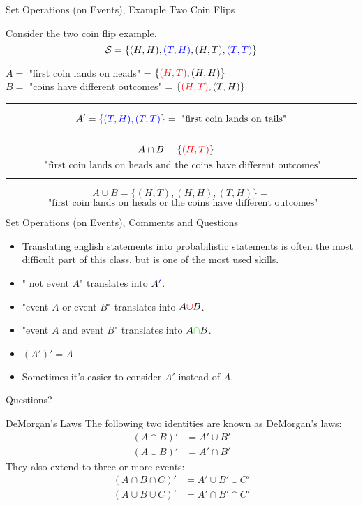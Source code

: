 \documentclass{beamer}
\newcommand{\blue}[1]{{\color{blue} #1}}
\newcommand{\red}[1]{{\color{red} #1}}
\newcommand{\grn}[1]{{\color{green} #1}}
\newcommand{\qtns}[0]{\begin{center} Questions? \end{center}}
\newcommand{\nl}[1]{\vspace{#1 em}}
\begin{document}
\begin{frame}{Set Operations (on Events), Example Two Coin Flips}

    Consider the two coin flip example.
    \[\mathcal{S} = \{ (H,H),\blue{(T,H)},(H,T), \blue{(T,T)}\}\]
    \begin{center}
        $A =$ "first coin lands on heads" = $\{\red{(H,T)},(H,H)\}$\\
        \nl{0.5}
        $B=$ "coins have different outcomes" = $\{\red{(H,T)},(T,H)\}$
    \end{center}
    \hrule
    \nl{0.5}
    \[A' = \{ \blue{(T,H), (T,T)} \} = \text{ "first coin lands on tails"}\]
    \hrule
    \nl{0.5}
    \[A\cap B = \{ \red{(H,T)}\} =\]
    \[ \text{ "first coin lands on heads and the coins have different outcomes"}\]
    \hrule
    \nl{0.5}
    \[A\cup B = \{ (H,T), (H,H), (T,H)\} =\]
    \[ \text{ "first coin lands on heads or the coins have different outcomes"}\]
\end{frame}

\begin{frame}{Set Operations (on Events), Comments and Questions}

    \begin{itemize}
        \item Translating english statements into probabilistic statements is often the most difficult part of this class, but is one of the most used skills.
        \item "\blue{not} event $A$" translates into $A\blue{'}$.
        \item "event $A$ \red{or} event $B$" translates into $A\red{\cup}B$.
        \item "event $A$ \grn{and} event $B$" translates into $A\grn{\cap}B$.
        \item $(A')' = A$
        \item Sometimes it's easier to consider $A'$ instead of $A$.
    \end{itemize}
    \qtns
\end{frame}

\begin{frame}{DeMorgan's Laws}
    The following two identities are known as DeMorgan's laws:
    \begin{align*}
        (A \cap B)' & = A' \cup B' \\
        (A \cup B)' & = A' \cap B'
    \end{align*}
    They also extend to three or more events:
    \begin{align*}
        (A \cap B \cap C)' & = A' \cup B' \cup C' \\
        (A \cup B \cup C)' & = A' \cap B' \cap C'
    \end{align*}
\end{frame}
\end{document}
